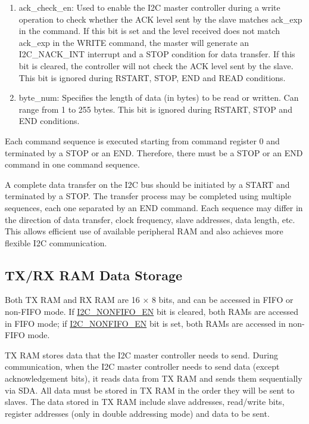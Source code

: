 \documentclass[main\_\_EN.tex]{subfiles}
\begin{document}
\begin{enumerate}
\item ack\_check\_en: Used to enable the I2C master controller during a write operation to check whether the ACK level sent by the slave matches ack\_exp in the command. If this bit is set and the level received does not match ack\_exp in the WRITE command, the master will generate an I2C\_NACK\_INT interrupt and a STOP condition for data transfer. If this bit is cleared, the controller will not check the ACK level sent by the slave. This bit is ignored during RSTART, STOP, END and READ conditions.

\item byte\_num: Specifies the length of data (in bytes) to be read or written. Can range from 1 to 255 bytes. This bit is ignored during RSTART, STOP and END conditions.
\end{enumerate}

Each command sequence is executed starting from command register 0 and terminated by a STOP or an END. Therefore, there must be a STOP or an END command in one command sequence.

A complete data transfer on the I2C bus should be initiated by a START and terminated by a STOP. The transfer process may be completed using multiple sequences, each one separated by an END command. Each sequence may differ in the direction of data transfer, clock frequency, slave addresses, data length, etc. This allows efficient use of available peripheral RAM and also achieves more flexible I2C communication.

\subsection{TX/RX RAM Data Storage}\label{subsubsec:i2c-txrx}
Both TX RAM and RX RAM are 16 × 8 bits, and can be accessed in FIFO or non-FIFO mode. If \hyperref[fielddesc:I2CNONFIFOEN]{I2C\_NONFIFO\_EN} bit is cleared, both RAMs are accessed in FIFO mode; if \hyperref[fielddesc:I2CNONFIFOEN]{I2C\_NONFIFO\_EN} bit is set, both RAMs are accessed in non-FIFO mode.

TX RAM stores data that the I2C master controller needs to send. During communication, when the I2C master controller needs to send data (except acknowledgement bits), it reads data from TX RAM and sends them sequentially via SDA. All data must be stored in TX RAM in the order they will be sent to slaves. The data stored in TX RAM include slave addresses, read/write bits, register addresses (only in double addressing mode) and data to be sent.
\end{document}
